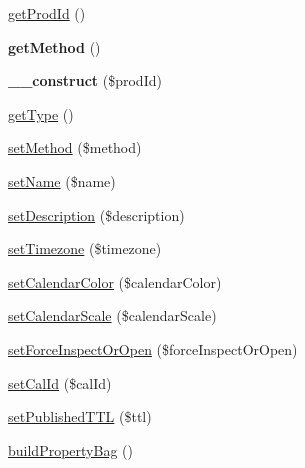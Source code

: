 \begin{DoxyCompactItemize}
\item 
\mbox{\hyperlink{class_eluceo_1_1i_cal_1_1_component_1_1_calendar_ab332398ea972edc7fb622b63a91532e2}{get\+Prod\+Id}} ()
\item 
\mbox{\label{class_eluceo_1_1i_cal_1_1_component_1_1_calendar_a5efc8e2d8dc2ef2bd8931a59cd81fa27}} 
{\bfseries get\+Method} ()
\item 
\mbox{\label{class_eluceo_1_1i_cal_1_1_component_1_1_calendar_a8d7eec047840f53c1ce6de22f9f7045a}} 
{\bfseries \+\_\+\+\_\+construct} (\$prod\+Id)
\item 
\mbox{\hyperlink{class_eluceo_1_1i_cal_1_1_component_1_1_calendar_a37cb0ba6b7ffa6b84ca9c06a8be7d882}{get\+Type}} ()
\item 
\mbox{\hyperlink{class_eluceo_1_1i_cal_1_1_component_1_1_calendar_a39023ed69e30af7b94799e7677197d16}{set\+Method}} (\$method)
\item 
\mbox{\hyperlink{class_eluceo_1_1i_cal_1_1_component_1_1_calendar_adf80b9aa9dc6481fe45b78142ae1aec2}{set\+Name}} (\$name)
\item 
\mbox{\hyperlink{class_eluceo_1_1i_cal_1_1_component_1_1_calendar_aedd67c51c2fe1386f132bfb45148cb59}{set\+Description}} (\$description)
\item 
\mbox{\hyperlink{class_eluceo_1_1i_cal_1_1_component_1_1_calendar_a4f3e601c0ef99350dc2b4d454fb126c9}{set\+Timezone}} (\$timezone)
\item 
\mbox{\hyperlink{class_eluceo_1_1i_cal_1_1_component_1_1_calendar_ac77495dbc6d258d3a385026f267966c3}{set\+Calendar\+Color}} (\$calendar\+Color)
\item 
\mbox{\hyperlink{class_eluceo_1_1i_cal_1_1_component_1_1_calendar_a869f95eff68194dc77eb549b17516feb}{set\+Calendar\+Scale}} (\$calendar\+Scale)
\item 
\mbox{\hyperlink{class_eluceo_1_1i_cal_1_1_component_1_1_calendar_a623d0cda85b6b5eda9600aa035b6388f}{set\+Force\+Inspect\+Or\+Open}} (\$force\+Inspect\+Or\+Open)
\item 
\mbox{\hyperlink{class_eluceo_1_1i_cal_1_1_component_1_1_calendar_a17acdac642afaf8e87e305fa44621564}{set\+Cal\+Id}} (\$cal\+Id)
\item 
\mbox{\hyperlink{class_eluceo_1_1i_cal_1_1_component_1_1_calendar_afc9e8e19e33559fed2c32ff4e2fedab8}{set\+Published\+T\+TL}} (\$ttl)
\item 
\mbox{\hyperlink{class_eluceo_1_1i_cal_1_1_component_1_1_calendar_ac38327d32ec22f39e2d556ded32731c9}{build\+Property\+Bag}} ()

\end{DoxyCompactItemize}
